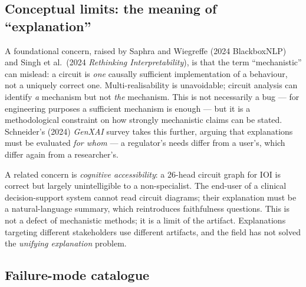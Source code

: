 \subsection{Conceptual limits: the meaning of ``explanation''}\label{conceptual-limits-the-meaning-of-explanation}

A foundational concern, raised by Saphra and Wiegreffe (2024 BlackboxNLP) and Singh et al.~(2024 \emph{Rethinking Interpretability}), is that the term ``mechanistic'' can mislead: a circuit is \emph{one} causally sufficient implementation of a behaviour, not a uniquely correct one. Multi-realisability is unavoidable; circuit analysis can identify \emph{a} mechanism but not \emph{the} mechanism. This is not necessarily a bug --- for engineering purposes a sufficient mechanism is enough --- but it is a methodological constraint on how strongly mechanistic claims can be stated. Schneider's (2024) \emph{GenXAI} survey takes this further, arguing that explanations must be evaluated \emph{for whom} --- a regulator's needs differ from a user's, which differ again from a researcher's.

A related concern is \emph{cognitive accessibility}: a 26-head circuit graph for IOI is correct but largely unintelligible to a non-specialist. The end-user of a clinical decision-support system cannot read circuit diagrams; their explanation must be a natural-language summary, which reintroduces faithfulness questions. This is not a defect of mechanistic methods; it is a limit of the artifact. Explanations targeting different stakeholders use different artifacts, and the field has not solved the \emph{unifying explanation} problem.

\subsection{Failure-mode catalogue}\label{failure-mode-catalogue}


